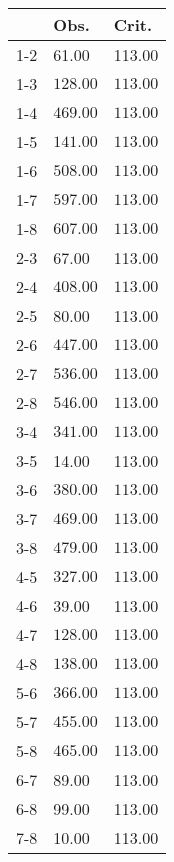 \begin{table}[ht]
\centering
\begin{tabular}{rll}
  \hline
 & Obs. & Crit. \\ 
  \hline
1-2 & 61.00 & 113.00 \\ 
  1-3 & \(\mathbf{128.00}\) & \(\mathbf{113.00}\) \\ 
  1-4 & \(\mathbf{469.00}\) & \(\mathbf{113.00}\) \\ 
  1-5 & \(\mathbf{141.00}\) & \(\mathbf{113.00}\) \\ 
  1-6 & \(\mathbf{508.00}\) & \(\mathbf{113.00}\) \\ 
  1-7 & \(\mathbf{597.00}\) & \(\mathbf{113.00}\) \\ 
  1-8 & \(\mathbf{607.00}\) & \(\mathbf{113.00}\) \\ 
  2-3 & 67.00 & 113.00 \\ 
  2-4 & \(\mathbf{408.00}\) & \(\mathbf{113.00}\) \\ 
  2-5 & 80.00 & 113.00 \\ 
  2-6 & \(\mathbf{447.00}\) & \(\mathbf{113.00}\) \\ 
  2-7 & \(\mathbf{536.00}\) & \(\mathbf{113.00}\) \\ 
  2-8 & \(\mathbf{546.00}\) & \(\mathbf{113.00}\) \\ 
  3-4 & \(\mathbf{341.00}\) & \(\mathbf{113.00}\) \\ 
  3-5 & 14.00 & 113.00 \\ 
  3-6 & \(\mathbf{380.00}\) & \(\mathbf{113.00}\) \\ 
  3-7 & \(\mathbf{469.00}\) & \(\mathbf{113.00}\) \\ 
  3-8 & \(\mathbf{479.00}\) & \(\mathbf{113.00}\) \\ 
  4-5 & \(\mathbf{327.00}\) & \(\mathbf{113.00}\) \\ 
  4-6 & 39.00 & 113.00 \\ 
  4-7 & \(\mathbf{128.00}\) & \(\mathbf{113.00}\) \\ 
  4-8 & \(\mathbf{138.00}\) & \(\mathbf{113.00}\) \\ 
  5-6 & \(\mathbf{366.00}\) & \(\mathbf{113.00}\) \\ 
  5-7 & \(\mathbf{455.00}\) & \(\mathbf{113.00}\) \\ 
  5-8 & \(\mathbf{465.00}\) & \(\mathbf{113.00}\) \\ 
  6-7 & 89.00 & 113.00 \\ 
  6-8 & 99.00 & 113.00 \\ 
  7-8 & 10.00 & 113.00 \\ 
   \hline
\end{tabular}
\end{table}
